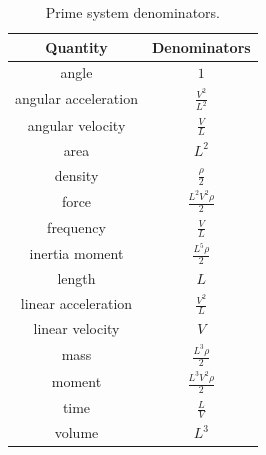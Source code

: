 \begin{table}[]
\caption{Prime system denominators.}
\label{tab:prime-system-denominators}
\centering
\label{tab:my_label}
\begin{tabular}{c c}
\toprule
Quantity &
Denominators
\\
\hline

angle
&

\(1\)
\\


angular
acceleration
&

\(\frac{V^{2}}{L^{2}}\)
\\


angular
velocity
&

\(\frac{V}{L}\)
\\


area
&

\(L^{2}\)
\\


density
&

\(\frac{\rho}{2}\)
\\


force
&

\(\frac{L^{2} V^{2} \rho}{2}\)
\\


frequency
&

\(\frac{V}{L}\)
\\


inertia
moment
&

\(\frac{L^{5} \rho}{2}\)
\\


length
&

\(L\)
\\


linear
acceleration
&

\(\frac{V^{2}}{L}\)
\\


linear
velocity
&

\(V\)
\\


mass
&

\(\frac{L^{3} \rho}{2}\)
\\


moment
&

\(\frac{L^{3} V^{2} \rho}{2}\)
\\


time
&

\(\frac{L}{V}\)
\\


volume
&

\(L^{3}\)
\\
\bottomrule

\end{tabular}


\end{table}

